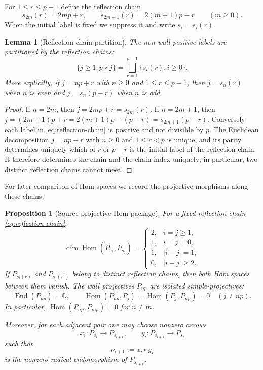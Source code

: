 \documentclass[12pt,leqno]{amsart}
\numberwithin{equation}{section}
\newtheorem{lem}[thm]{Lemma}
\newtheorem{prop}[thm]{Proposition}
\newcommand{\End}{\operatorname{End}}
\newcommand{\Hom}{\operatorname{Hom}}
\def\C{\mathbb{C}}
\begin{document}
For $1\leq r\leq p-1$ define the reflection chain
\begin{equation}\label{eq:reflection-chain}
 s_{2m}(r)=2mp+r,\qquad
 s_{2m+1}(r)=2(m+1)p-r
 \qquad(m\geq0).
\end{equation}
When the initial label is fixed we suppress it and write $s_i=s_i(r)$.

\begin{lem}[Reflection-chain partition]\label{lem:reflection-partition}
The non-wall positive labels are partitioned by the reflection chains:
\[
 \{j\geq1:p\nmid j\}
 =\bigsqcup_{r=1}^{p-1}\{s_i(r):i\geq0\}.
\]
More explicitly, if $j=np+r$ with $n\geq0$ and $1\leq r\leq p-1$,
then $j=s_n(r)$ when $n$ is even and $j=s_n(p-r)$ when $n$ is odd.
\end{lem}

\begin{proof}
If $n=2m$, then $j=2mp+r=s_{2m}(r)$.  If $n=2m+1$, then
$j=(2m+1)p+r=2(m+1)p-(p-r)=s_{2m+1}(p-r)$.  Conversely each label in
\eqref{eq:reflection-chain} is positive and not divisible by $p$.
The Euclidean decomposition $j=np+r$ with $n\ge0$ and $1\le r<p$ is
unique, and its parity determines uniquely which of $r$ or $p-r$ is the
initial label of the reflection chain.  It therefore determines the chain
and the chain index uniquely; in particular, two distinct reflection chains
cannot meet.
\end{proof}

For later comparison of Hom spaces we record the projective morphisms along
these chains.

\begin{prop}[Source projective Hom package]\label{prop:source-Hom-package}
For a fixed reflection chain \eqref{eq:reflection-chain},
\[
 \dim\Hom(P_{s_i},P_{s_j})=
 \begin{cases}
 2,&i=j\geq1,\\
 1,&i=j=0,\\
 1,&|i-j|=1,\\
 0,&|i-j|\geq2.
 \end{cases}
\]
If $P_{s_i(r)}$ and $P_{s_j(r')}$ belong to distinct reflection chains,
then both Hom spaces between them vanish.  The wall projectives $P_{np}$ are isolated
simple-projectives:
\[
 \End(P_{np})=\C,\qquad
 \Hom(P_{np},P_j)=\Hom(P_j,P_{np})=0\quad(j\ne np).
\]
In particular, $\Hom(P_{np},P_{mp})=0$ for $n\ne m$.

Moreover, for each adjacent pair one may choose nonzero arrows
\[
 x_i:P_{s_i}\longrightarrow P_{s_{i+1}},
 \qquad
 y_i:P_{s_{i+1}}\longrightarrow P_{s_i}
\]
such that
\begin{equation}\label{eq:source-zigzag-composition}
 \nu_{i+1}:=x_i\circ y_i
\end{equation}
is the nonzero radical endomorphism of $P_{s_{i+1}}$.
\end{prop}
\end{document}
